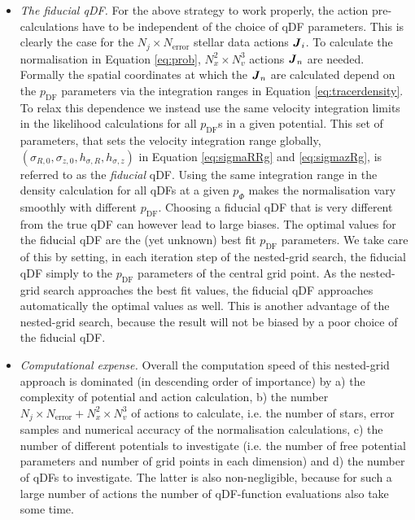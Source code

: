 \begin{itemize}
\item \emph{The fiducial qDF.} For the above strategy to work properly, the action pre-calculations have to be independent of the choice of qDF parameters. This is clearly the case for the $N_j \times N_\text{error}$ stellar data actions $\boldsymbol{J}_i$. To calculate the normalisation in Equation \ref{eq:prob}, $N_x^2 \times N_v^3$ actions $\boldsymbol{J}_n$ are needed. Formally the spatial coordinates at which the $\boldsymbol{J}_n$ are calculated depend on the $p_\text{DF}$ parameters via the integration ranges in Equation \ref{eq:tracerdensity}. To relax this dependence we instead use the same velocity integration limits in the likelihood calculations for all $p_\text{DF}$s in a given potential. This set of parameters, that sets the velocity integration range globally, $(\sigma_{R,0},\sigma_{z,0},h_{\sigma,R},h_{\sigma,z})$ in Equation \ref{eq:sigmaRRg} and \ref{eq:sigmazRg}, is referred to as the \emph{fiducial} qDF. Using the same integration range in the density calculation for all qDFs at a given $p_\Phi$ makes the normalisation vary smoothly with different $p_\text{DF}$. Choosing a fiducial qDF that is very different from the true qDF can however lead to large biases. The optimal values for the fiducial qDF are the (yet unknown) best fit $p_\text{DF}$ parameters. We take care of this by setting, in each iteration step of the nested-grid search, the fiducial qDF simply to the $p_\text{DF}$ parameters of the central grid point.  As the nested-grid search approaches the best fit values, the fiducial qDF approaches automatically the optimal values as well. This is another advantage of the nested-grid search, because the result will not be biased by a poor choice of the fiducial qDF.

\item \emph{Computational expense.} Overall the computation speed of this nested-grid approach is dominated (in descending order of importance) by a) the complexity of potential and action calculation, b) the number $N_j \times N_\text{error} + N_x^2 \times N_v^3$ of actions to calculate, i.e. the number of stars, error samples and numerical accuracy of the normalisation calculations, c) the number of different potentials to investigate (i.e. the number of free potential parameters and number of grid points in each dimension) and d) the number of qDFs to investigate. The latter is also non-negligible, because for such a large number of actions the number of  qDF-function evaluations also take some time.
\end{itemize}

